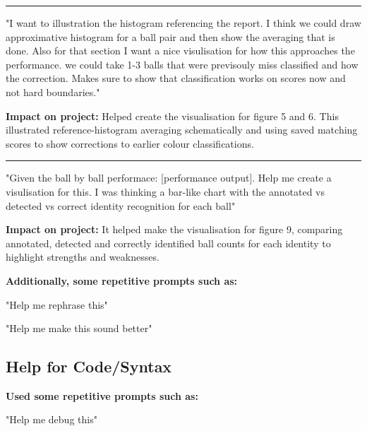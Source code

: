 \documentclass[12pt,a4paper]{article}
\newenvironment{promptentry}{%
    \par\Needspace{7\baselineskip}\addvspace{1.2em}
    \hrule
    \nobreak\vspace{0.5em}
}{\par\addvspace{0.5em}}
\newenvironment{aiprompt}{%
    \begin{list}{}{%
        \setlength{\leftmargin}{1em}%
        \setlength{\rightmargin}{1em}%
        \setlength{\topsep}{0.3em}%
        \setlength{\parsep}{0pt}%
    }%
    \item\relax
}{\end{list}}
\begin{document}
\begin{promptentry}
\begin{aiprompt}
"I want to illustration the histogram referencing the report. I think we could draw
approximative histogram for a ball pair and then show the averaging that is done.
Also for that section I want a nice visulisation for how this approaches the performance.
we could take 1-3 balls that were previsouly miss classified and how the correction. Makes sure
to show that classification works on scores now and not hard boundaries."
\end{aiprompt}
\end{promptentry}
\FloatBarrier

\textbf{Impact on project:} Helped create the visualisation for figure 5 and 6.
This illustrated reference-histogram averaging schematically and using 
saved matching scores to show corrections to earlier colour 
classifications.

\begin{promptentry}
\begin{aiprompt}
"Given the ball by ball performace: [performance output]. Help me create a visulisation for this.
I was thinking a bar-like chart with the annotated vs detected vs correct identity recognition for each
ball"
\end{aiprompt}
\end{promptentry}
\FloatBarrier

\textbf{Impact on project:} It helped make the visualisation for figure 9, comparing 
annotated, detected and correctly identified ball counts for each 
identity to highlight strengths and weaknesses.

\newpage


\textbf{Additionally, some repetitive prompts such as:}

\begin{aiprompt}
"Help me rephrase this" 
\end{aiprompt}

\begin{aiprompt}
"Help me make this sound better"
\end{aiprompt}

\subsection{Help for Code/Syntax}

\textbf{Used some repetitive prompts such as:}

\begin{aiprompt}
"Help me debug this"
\end{aiprompt}
\end{document}
